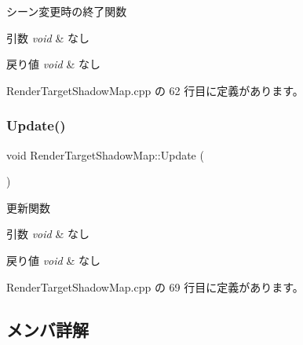 シーン変更時の終了関数 


\begin{DoxyParams}{引数}
{\em void} & なし \\
\hline
\end{DoxyParams}

\begin{DoxyRetVals}{戻り値}
{\em void} & なし \\
\hline
\end{DoxyRetVals}


 Render\+Target\+Shadow\+Map.\+cpp の 62 行目に定義があります。

\mbox{\label{class_render_target_shadow_map_aeba65fc4188bb72dd840f775900d0391}} 
\subsubsection{\texorpdfstring{Update()}{Update()}}
{\footnotesize\ttfamily void Render\+Target\+Shadow\+Map\+::\+Update (\begin{DoxyParamCaption}{ }\end{DoxyParamCaption})}



更新関数 


\begin{DoxyParams}{引数}
{\em void} & なし \\
\hline
\end{DoxyParams}

\begin{DoxyRetVals}{戻り値}
{\em void} & なし \\
\hline
\end{DoxyRetVals}


 Render\+Target\+Shadow\+Map.\+cpp の 69 行目に定義があります。



\subsection{メンバ詳解}
\mbox{\label{class_render_target_shadow_map_a25b5fd61eef50d76b69314102ccc51fe}} 
